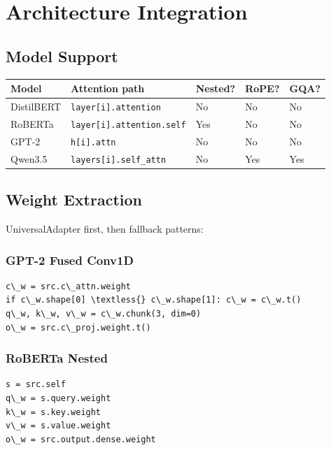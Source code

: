 \section{Architecture Integration}

\subsection{Model Support}

\begin{table}[H]
\centering
\small
\begin{tabular}{lllll}
\toprule
\textbf{Model} & \textbf{Attention path} & \textbf{Nested?} & \textbf{RoPE?} & \textbf{GQA?} \\
\midrule
DistilBERT & \texttt{layer[i].attention} & No & No & No \\
RoBERTa & \texttt{layer[i].attention.self} & Yes & No & No \\
GPT-2 & \texttt{h[i].attn} & No & No & No \\
Qwen3.5 & \texttt{layers[i].self\_attn} & No & Yes & Yes \\
\bottomrule
\end{tabular}
\end{table}

\subsection{Weight Extraction}

UniversalAdapter first, then fallback patterns:

\subsubsection{GPT-2 Fused Conv1D}

\begin{lstlisting}
c\_w = src.c\_attn.weight
if c\_w.shape[0] \textless{} c\_w.shape[1]: c\_w = c\_w.t()
q\_w, k\_w, v\_w = c\_w.chunk(3, dim=0)
o\_w = src.c\_proj.weight.t()
\end{lstlisting}

\subsubsection{RoBERTa Nested}

\begin{lstlisting}
s = src.self
q\_w = s.query.weight
k\_w = s.key.weight
v\_w = s.value.weight
o\_w = src.output.dense.weight
\end{lstlisting}

